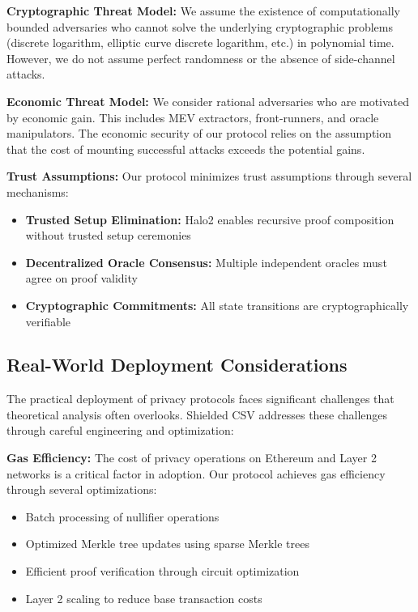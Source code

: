 \documentclass[11pt,a4paper]{article}
\begin{document}
\textbf{Cryptographic Threat Model:} We assume the existence of computationally bounded adversaries who cannot solve the underlying cryptographic problems (discrete logarithm, elliptic curve discrete logarithm, etc.) in polynomial time. However, we do not assume perfect randomness or the absence of side-channel attacks.

\textbf{Economic Threat Model:} We consider rational adversaries who are motivated by economic gain. This includes MEV extractors, front-runners, and oracle manipulators. The economic security of our protocol relies on the assumption that the cost of mounting successful attacks exceeds the potential gains.

\textbf{Trust Assumptions:} Our protocol minimizes trust assumptions through several mechanisms:
\begin{itemize}
    \item \textbf{Trusted Setup Elimination:} Halo2 enables recursive proof composition without trusted setup ceremonies
    \item \textbf{Decentralized Oracle Consensus:} Multiple independent oracles must agree on proof validity
    \item \textbf{Cryptographic Commitments:} All state transitions are cryptographically verifiable
\end{itemize}

\subsection{Real-World Deployment Considerations}

The practical deployment of privacy protocols faces significant challenges that theoretical analysis often overlooks. Shielded CSV addresses these challenges through careful engineering and optimization:

\textbf{Gas Efficiency:} The cost of privacy operations on Ethereum and Layer 2 networks is a critical factor in adoption. Our protocol achieves gas efficiency through several optimizations:
\begin{itemize}
    \item Batch processing of nullifier operations
    \item Optimized Merkle tree updates using sparse Merkle trees
    \item Efficient proof verification through circuit optimization
    \item Layer 2 scaling to reduce base transaction costs
\end{itemize}
\end{document}

